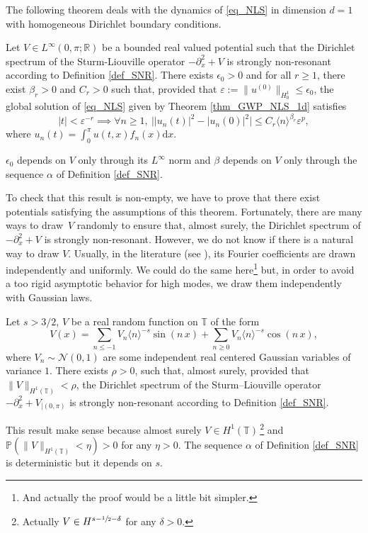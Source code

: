 The following theorem deals with the dynamics of \eqref{eq_NLS} in dimension $d=1$ with homogeneous Dirichlet boundary conditions.
\begin{theorem}[Case $\Omega = \Omega^{\mathrm{Dir}}_1$]
\label{thm_Dir_1d}
Let $V \in L^\infty(0,\pi; \mathbb{R})$ be a bounded real valued potential such that the Dirichlet spectrum of the Sturm-Liouville operator $-\partial_x^2 +V$ is strongly non-resonant according to Definition \ref{def_SNR}. There exists $\epsilon_0>0$ and for all $r\geq 1$, there exist $\beta_r>0$ and $C_r>0$ such that, provided that $\varepsilon:= \| u^{(0)} \|_{H^1_0} \leq \epsilon_{0}$,
the global solution of \eqref{eq_NLS} given by Theorem \ref{thm_GWP_NLS_1d} satisfies
\[
|t|< \varepsilon^{-r} \implies \forall n\geq 1, \ \big| |u_n(t)|^2 - |u_n(0)|^2 \big| \leq C_r \langle n \rangle^{\beta_r} \varepsilon^p,
\]
where $u_n(t) = \int_0^\pi u(t,x) f_n(x) \mathrm{d}x$.
\end{theorem}
\begin{remark}
\label{rem_dep}$\epsilon_0$ depends on $V$ only through its $L^\infty$ norm and $\beta$ depends on $V$ only through the sequence $\alpha$ of Definition \ref{def_SNR}.
\end{remark}

To check that this result is non-empty, we have to prove that there exist potentials satisfying the assumptions of this theorem. Fortunately, there are many ways to draw~$V$ randomly to ensure that, almost surely, the Dirichlet spectrum of $-\partial_x^2 +V$ is strongly non-resonant. However, we do not know if there is a natural way to draw $V$. Usually, in the literature (see \eg \cite{Bou00,BG06,YZ14,KillBill,KtA}), its Fourier coefficients are drawn independently and uniformly. We could do the same here\footnote{And actually the proof would be a little bit simpler.} but, in order to avoid a too rigid asymptotic behavior for high modes, we draw them independently with Gaussian laws.

\begin{proposition}
\label{prop_proba_dir_1d}
Let $s>3/2$, $V$ be a real random function on $\mathbb{T}$ of the form
\begin{equation}
\label{eq_V_dir}
V(x) = \sum_{n\leq -1} V_n \langle n \rangle^{-s} \sin(n \, x) + \sum_{n \geq 0 } V_n \langle n \rangle^{-s} \cos(n \, x),
\end{equation}
where $V_n \sim \mathcal{N}(0,1)$ are some independent real centered Gaussian variables of variance $1$. There exists $\rho>0$, such that, almost surely, provided that $\|V\|_{H^1(\mathbb{T})}< \rho$, the Dirichlet spectrum of the Sturm--Liouville operator $-\partial_x^2 +V_{| (0,\pi)}$ is strongly non-resonant according to Definition \ref{def_SNR}.
\end{proposition}
\begin{remark} This result make sense because almost surely $V\in H^1(\mathbb{T})\,$\footnote{Actually $V\in H^{s-\sfrac12-\delta}$ for any $\delta>0$.} and $\mathbb{P}(\|V\|_{H^1(\mathbb{T})} < \eta)>0$ for any $\eta>0$. The sequence $\alpha$ of Definition \ref{def_SNR} is deterministic but it depends on $s$.
\end{remark}


